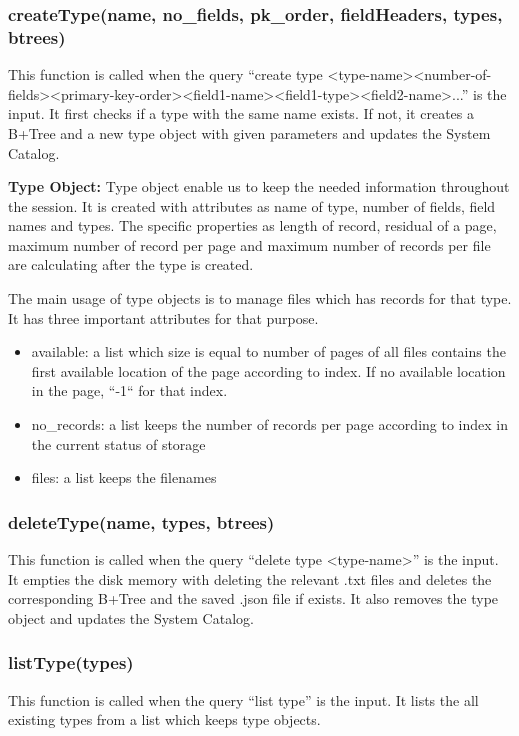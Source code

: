\documentclass{article}
\begin{document}
\subsubsection{createType(name, no\_fields, pk\_order, fieldHeaders, types, btrees)}
This function is called when the query “create type \textless type-name\textgreater \textless number-of-fields\textgreater \textless primary-key-order\textgreater \textless field1-name\textgreater \textless field1-type\textgreater \textless field2-name\textgreater...” is the input. It first checks if a type with the same name exists. If not, it creates a B+Tree and a new type object with given parameters and updates the System Catalog.

\textbf{Type Object:} Type object enable us to keep the needed information throughout the session. It is created with attributes as name of type, number of fields, field names and types. The specific properties as length of record, residual of a page, maximum number of record per page and maximum number of records per file are calculating after the type is created.

The main usage of type objects is to manage files which has records for that type. It has three important attributes for that purpose.
\begin{itemize}
    \item available: a list which size is equal to number of pages of all files contains the first available location of the page according to index. If no available location in the page, “-1“ for that index.  
    \item no\_records: a list keeps the number of records per page according to index in the current status of storage
    \item files: a list keeps the filenames
\end{itemize}

\subsubsection{deleteType(name, types, btrees)}
This function is called when the query “delete type \textless type-name\textgreater” is the input. It empties the disk memory with deleting the relevant .txt files and deletes the corresponding B+Tree and the saved .json file if exists. It also removes the type object and updates the System Catalog.

\subsubsection{listType(types)}
This function is called when the query “list type” is the input. It lists the all existing types from a list which keeps type objects.
\end{document}
